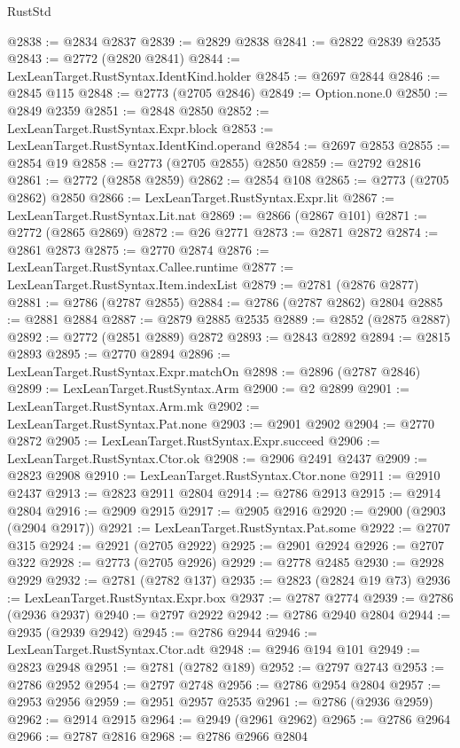 \begin{lexlean}{RustStd}
\begin{coremodule}
@2838 := @2834 @2837
@2839 := @2829 @2838
@2841 := @2822 @2839 @2535
@2843 := @2772 (@2820 @2841)
@2844 := LexLeanTarget.RustSyntax.IdentKind.holder
@2845 := @2697 @2844
@2846 := @2845 @115
@2848 := @2773 (@2705 @2846)
@2849 := Option.none.{0}
@2850 := @2849 @2359
@2851 := @2848 @2850
@2852 := LexLeanTarget.RustSyntax.Expr.block
@2853 := LexLeanTarget.RustSyntax.IdentKind.operand
@2854 := @2697 @2853
@2855 := @2854 @19
@2858 := @2773 (@2705 @2855) @2850
@2859 := @2792 @2816
@2861 := @2772 (@2858 @2859)
@2862 := @2854 @108
@2865 := @2773 (@2705 @2862) @2850
@2866 := LexLeanTarget.RustSyntax.Expr.lit
@2867 := LexLeanTarget.RustSyntax.Lit.nat
@2869 := @2866 (@2867 @101)
@2871 := @2772 (@2865 @2869)
@2872 := @26 @2771
@2873 := @2871 @2872
@2874 := @2861 @2873
@2875 := @2770 @2874
@2876 := LexLeanTarget.RustSyntax.Callee.runtime
@2877 := LexLeanTarget.RustSyntax.Item.indexList
@2879 := @2781 (@2876 @2877)
@2881 := @2786 (@2787 @2855)
@2884 := @2786 (@2787 @2862) @2804
@2885 := @2881 @2884
@2887 := @2879 @2885 @2535
@2889 := @2852 (@2875 @2887)
@2892 := @2772 (@2851 @2889) @2872
@2893 := @2843 @2892
@2894 := @2815 @2893
@2895 := @2770 @2894
@2896 := LexLeanTarget.RustSyntax.Expr.matchOn
@2898 := @2896 (@2787 @2846)
@2899 := LexLeanTarget.RustSyntax.Arm
@2900 := @2 @2899
@2901 := LexLeanTarget.RustSyntax.Arm.mk
@2902 := LexLeanTarget.RustSyntax.Pat.none
@2903 := @2901 @2902
@2904 := @2770 @2872
@2905 := LexLeanTarget.RustSyntax.Expr.succeed
@2906 := LexLeanTarget.RustSyntax.Ctor.ok
@2908 := @2906 @2491 @2437
@2909 := @2823 @2908
@2910 := LexLeanTarget.RustSyntax.Ctor.none
@2911 := @2910 @2437
@2913 := @2823 @2911 @2804
@2914 := @2786 @2913
@2915 := @2914 @2804
@2916 := @2909 @2915
@2917 := @2905 @2916
@2920 := @2900 (@2903 (@2904 @2917))
@2921 := LexLeanTarget.RustSyntax.Pat.some
@2922 := @2707 @315
@2924 := @2921 (@2705 @2922)
@2925 := @2901 @2924
@2926 := @2707 @322
@2928 := @2773 (@2705 @2926)
@2929 := @2778 @2485
@2930 := @2928 @2929
@2932 := @2781 (@2782 @137)
@2935 := @2823 (@2824 @19 @73)
@2936 := LexLeanTarget.RustSyntax.Expr.box
@2937 := @2787 @2774
@2939 := @2786 (@2936 @2937)
@2940 := @2797 @2922
@2942 := @2786 @2940 @2804
@2944 := @2935 (@2939 @2942)
@2945 := @2786 @2944
@2946 := LexLeanTarget.RustSyntax.Ctor.adt
@2948 := @2946 @194 @101
@2949 := @2823 @2948
@2951 := @2781 (@2782 @189)
@2952 := @2797 @2743
@2953 := @2786 @2952
@2954 := @2797 @2748
@2956 := @2786 @2954 @2804
@2957 := @2953 @2956
@2959 := @2951 @2957 @2535
@2961 := @2786 (@2936 @2959)
@2962 := @2914 @2915
@2964 := @2949 (@2961 @2962)
@2965 := @2786 @2964
@2966 := @2787 @2816
@2968 := @2786 @2966 @2804

\end{coremodule}
\end{lexlean}
